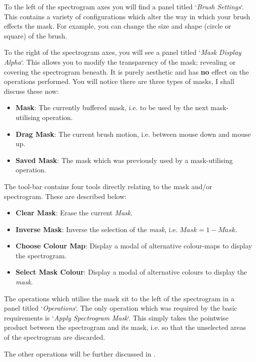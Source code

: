 \documentclass{coursework}
\begin{document}
			To the left of the spectrogram axes you will find a panel titled `\textit{Brush Settings}`. This contains a variety of configurations which alter the way in which your brush effects the mask. For example, you can change the size and shape (circle or square) of the brush.
			
			To the right of the spectrogram axes, you will see a panel titled `\textit{Mask Display Alpha}`. This allows you to modify the transparency of the mask; revealing or covering the spectrogram beneath. It is purely aesthetic and has \textbf{no} effect on the operations performed. You will notice there are three types of masks, I shall discuss these now:
			
			\begin{itemize}
				\item \textbf{Mask}: The currently buffered mask, i.e. to be used by the next mask-utilising operation.
				\item \textbf{Drag Mask}: The current brush motion, i.e. between mouse down and mouse up.
				\item \textbf{Saved Mask}: The mask which was previously used by a mask-utilising operation.
			\end{itemize}
	
			The tool-bar contains four tools directly relating to the mask and/or spectrogram. These are described below:
			\begin{itemize}
				\item \textbf{Clear Mask}: Erase the current \textit{Mask}.
				\item \textbf{Inverse Mask}: Inverse the selection of the \textit{mask}, i.e. $Mask = 1 - Mask$.
				\item \textbf{Choose Colour Map}: Display a modal of alternative colour-maps to display the spectrogram.
				\item \textbf{Select Mask Colour}: Display a modal of alternative colours to display the \textit{mask}.
			\end{itemize}
			
			The operations which utilise the mask sit to the left of the spectrogram in a panel titled `\textit{Operations}`. The only operation which was required by the basic requirements is `\textit{Apply Spectrogram Mask}`. This simply takes the pointwise product between the spectrogram and its mask, i.e. so that the unselected areas of the spectrogram are discarded.
			
			The other operations will be further discussed in .
			
\end{document}
